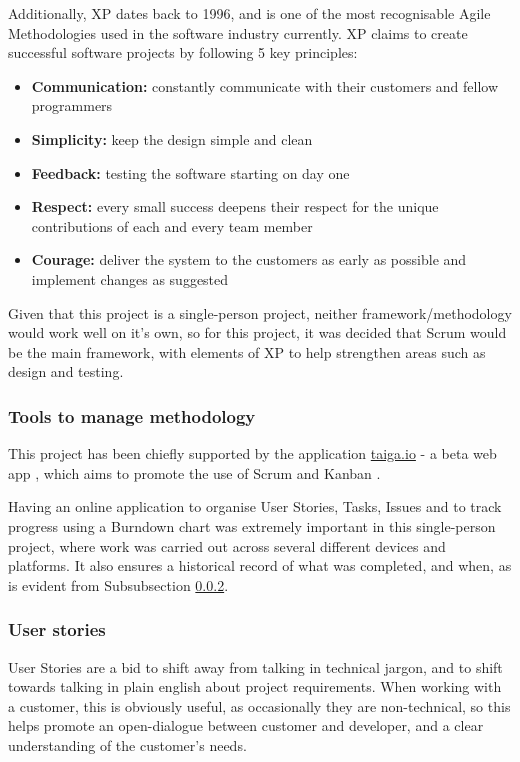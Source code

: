 Additionally, \acrfull{XP} \cite{xp} dates back to 1996, and is one of the most recognisable Agile Methodologies used in the software industry currently. \acrshort{XP} claims to create successful software projects by following 5 key principles:

\begin{itemize}
  \item \textbf{Communication: } constantly communicate with their customers and fellow programmers
  \item \textbf{Simplicity:} keep the design simple and clean
  \item \textbf{Feedback:} testing the software starting on day one
  \item \textbf{Respect: } every small success deepens their respect for the unique contributions of each and every team member
  \item \textbf{Courage: } deliver the system to the customers as early as possible and implement changes as suggested
\end{itemize}

Given that this project is a single-person project, neither framework/methodology would work well on it's own, so for this project, it was decided that Scrum would be the main framework, with elements of XP to help strengthen areas such as design and testing.

\subsubsection{Tools to manage methodology}

This project has been chiefly supported by the application \url{taiga.io} - a beta web app \cite{Taiga.io}, which aims to promote the use of Scrum and Kanban \cite{kanban}.

Having an online application to organise User Stories, Tasks, Issues and to track progress using a Burndown chart was extremely important in this single-person project, where work was carried out across several different devices and platforms. It also ensures a historical record of what was completed, and when, as is evident from Subsubsection \ref{sssec:user-stories}.

\subsubsection{User stories}
\label{sssec:user-stories}

User Stories are a bid to shift away from talking in technical jargon, and to shift towards talking in plain english about project requirements. When working with a customer, this is obviously useful, as occasionally they are non-technical, so this helps promote an open-dialogue between customer and developer, and a clear understanding of the customer's needs.

